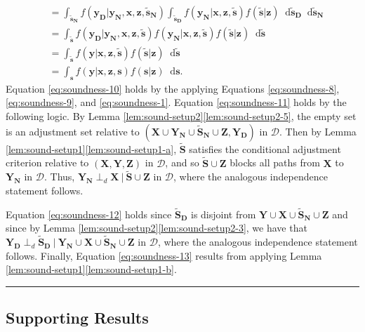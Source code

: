 \documentclass[twoside]{article}
\newcommand\given[1][]{\:#1\vert\:}
\newcommand{\mb}[1]{\mathbf{#1}}
\newcommand{\dsepp}{\perp_{d}}
\newcommand{\g}[1][G]{\mathcal{#1}}
\newcommand*\diff{\mathop{}\!\mathrm{d}}
\newenvironment{proofof}[1][]{\begin{trivlist}
\item[\hskip \labelsep {\bfseries Proof of #1.}]}{\hfill\BlackBox\end{trivlist}}
\newcommand{\BlackBox}{\rule{1.5ex}{1.5ex}}
\begin{document}
\begin{proofof}[Theorem \ref{thm:soundness}]
\begin{align}
            &= \int_{\mb{\tilde{s}_N}} f(\mb{y_D} | \mb{y_N,x,z,\tilde{s}_N}) \int_{\mb{\tilde{s}_D}} f(\mb{y_N} | \mb{x,z,\tilde{s}}) f(\mb{\tilde{s}} | \mb{z}) \diff \mb{\tilde{s}_D} \diff \mb{\tilde{s}_N} \label{eq:soundness-11} \\
            &= \int_{\mb{\tilde{s}}} f(\mb{y_D} | \mb{y_N,x,z,\tilde{s}}) f(\mb{y_N} | \mb{x,z,\tilde{s}}) f(\mb{\tilde{s}} | \mb{z}) \diff \mb{\tilde{s}} \label{eq:soundness-12} \\
            &= \int_{\mb{\tilde{s}}} f(\mb{y} | \mb{x,z,\tilde{s}}) f(\mb{\tilde{s}} | \mb{z}) \diff \mb{\tilde{s}} \nonumber \\
            &= \int_{\mb{s}} f(\mb{y} | \mb{x,z,}\mb{s}) f(\mb{s} | \mb{z}) \diff \mb{s}. \label{eq:soundness-13}
    \end{align}
    Equation \eqref{eq:soundness-10} holds by the applying Equations \eqref{eq:soundness-8}, \eqref{eq:soundness-9}, and \eqref{eq:soundness-1}. Equation \eqref{eq:soundness-11} holds by the following logic. By Lemma \ref{lem:sound-setup2}\ref{lem:sound-setup2-5}, the empty set is an adjustment set relative to $(\mb{X} \cup \mb{Y_N} \cup \mb{\tilde{S}_N} \cup \mb{Z}, \mb{Y_D})$ in $\g[D]$. Then by Lemma \ref{lem:sound-setup1}\ref{lem:sound-setup1-a}, $\mb{\tilde{S}}$ satisfies the conditional adjustment criterion relative to $(\mb{X,Y,Z})$ in $\g[D]$, and so $\mb{\tilde{S}} \cup \mb{Z}$ blocks all paths from $\mb{X}$ to $\mb{Y_N}$ in $\g[D]$. Thus, $\mb{Y_N} \dsepp \mb{X} \given \mb{\tilde{S}} \cup \mb{Z}$ in $\g[D]$, where the analogous independence statement follows.

    Equation \eqref{eq:soundness-12} holds since $\mb{\tilde{S}_D}$ is disjoint from $\mb{Y} \cup \mb{X} \cup \mb{\tilde{S}_N} \cup \mb{Z}$ and since by Lemma \ref{lem:sound-setup2}\ref{lem:sound-setup2-3}, we have that $\mb{Y_D} \dsepp \mb{\tilde{S}_D} \given \mb{Y_N} \cup \mb{X} \cup \mb{\tilde{S}_N} \cup \mb{Z}$ in $\g[D]$, where the analogous independence statement follows. Finally, Equation \eqref{eq:soundness-13} results from applying Lemma \ref{lem:sound-setup1}\ref{lem:sound-setup1-b}.
\end{proofof}






\subsection{Supporting Results}
\end{document}

